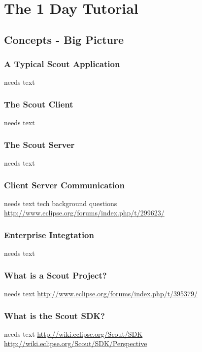 \documentclass[a4paper,10pt,twoside]{book}
\begin{document}
  \sloppy
\fi


\chapter{The 1 Day Tutorial}

\section{Concepts - Big Picture}

\subsection{A Typical Scout Application}
needs text

\subsection{The Scout Client}
needs text

\subsection{The Scout Server}
needs text

\subsection{Client Server Communication}
needs text
tech background questions \url{http://www.eclipse.org/forums/index.php/t/299623/}

\subsection{Enterprise Integtation}
needs text

\subsection{What is a Scout Project?}
needs text
\url{http://www.eclipse.org/forums/index.php/t/395379/}

\subsection{What is the Scout SDK?}
needs text
\url{http://wiki.eclipse.org/Scout/SDK}
\url{http://wiki.eclipse.org/Scout/SDK/Perspective}
\end{document}

